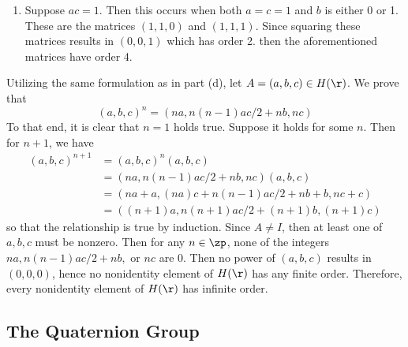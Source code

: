 \begin{problems}
\begin{solalph}
\begin{enumerate}
            \item Suppose $ac = 1$. Then this occurs when both $a = c = 1$ and $b$ is either 0 or 1. These are the matrices $(1, 1, 0)$ and $(1, 1, 1)$. Since squaring these matrices results in $(0, 0, 1)$ which has order 2. then the aforementioned matrices have order 4.
        \end{enumerate}
        \item Utilizing the same formulation as in part (d), let $A = (a, b, c) \in H(\r)$. We prove that
        $$(a, b, c)^n = (na, n(n - 1)ac/2 + nb, nc)$$
        To that end, it is clear that $n = 1$ holds true. Suppose it holds for some $n$. Then for $n + 1$, we have
        \begin{align*}
            (a, b, c)^{n + 1} & = (a, b, c)^n(a, b, c) \\
            & = (na, n(n - 1)ac/2 + nb, nc)(a, b, c) \\
            & = (na + a, (na)c + n(n - 1)ac/2 + nb + b, nc + c) \\
            & = ((n + 1)a, n(n + 1)ac/2 + (n + 1)b, (n + 1)c)
        \end{align*}
        so that the relationship is true by induction. Since $A \neq I$, then at least one of $a, b, c$ must be nonzero. Then for any $n \in \zp$, none of the integers $na, n(n - 1)ac/2 + nb,$ or $nc$ are 0. Then no power of $(a, b, c)$ results in $(0, 0, 0)$, hence no nonidentity element of $H(\r)$ has any finite order. Therefore, every nonidentity element of $H(\r)$ has infinite order.
    \end{solalph}
\end{problems}

\newpage

\subsection{The Quaternion Group}

